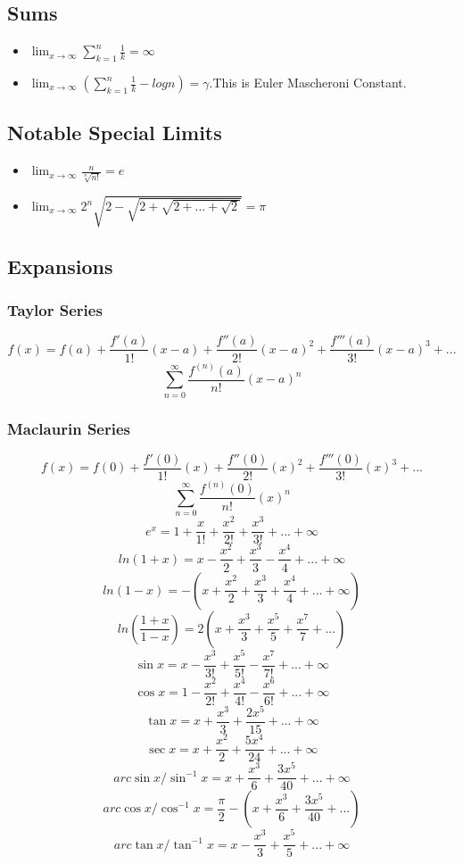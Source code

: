 \documentclass[12pt]{article}
\begin{document}
\subsection{Sums}
\begin{itemize}
\item $\lim_{x \to \infty} \sum_{k=1}^{n} \frac{1}{k}= 
\infty $
\item $\lim_{x \to \infty} (\sum_{k=1}^{n} \frac{1}{k}-logn)= 
\gamma $.This is Euler Mascheroni Constant.
\end{itemize}
\subsection{Notable Special Limits}
\begin{itemize}
\item $\lim_{x \to \infty} \frac{n}{\sqrt[n]{n!}}=e$
\item $\lim_{x \to \infty} 2^n \sqrt{2- \sqrt{2 + \sqrt{2 +...+ \sqrt{2}}}}= \pi $
\end{itemize}
\subsection{Expansions}
\subsubsection{Taylor Series}
$$f(x)=f(a)+\frac{f'(a)}{1!}(x-a)+\frac{f''(a)}{2!}(x-a)^2+\frac{f'''(a)}{3!}(x-a)^3+...$$
$$\sum_{n=0}^{\infty} \frac{f^{(n)}(a)}{n!}(x-a)^n$$
\subsubsection{Maclaurin Series}
$$f(x)=f(0)+\frac{f'(0)}{1!}(x)+\frac{f''(0)}{2!}(x)^2+\frac{f'''(0)}{3!}(x)^3+...$$
$$\sum_{n=0}^{\infty} \frac{f^{(n)}(0)}{n!}(x)^n$$
$$e^x = 1 + \frac{x}{1!}+ \frac{x^{2}}{2!}+ \frac{x^{3}}{3!}+...+ \infty$$
$$ln(1+x) = x - \frac{x^{2}}{2}+ \frac{x^{3}}{3}- \frac{x^{4}}{4}+...+ \infty$$
$$ln(1-x) = -(x + \frac{x^{2}}{2}+ \frac{x^{3}}{3}+ \frac{x^{4}}{4}+...+ \infty)$$
$$ln(\frac{1+x}{1-x}) = 2(x+ \frac{x^{3}}{3}+ \frac{x^{5}}{5}+ \frac{x^{7}}{7}+...)$$
$$\sin x = x - \frac{x^{3}}{3!}+ \frac{x^{5}}{5!}- \frac{x^{7}}{7!}+...+ \infty$$
$$\cos x = 1 - \frac{x^{2}}{2!}+ \frac{x^{4}}{4!}- \frac{x^{6}}{6!}+...+ \infty$$
$$\tan x = x + \frac{x^{3}}{3}+ \frac{2x^{5}}{15}+...+ \infty$$
$$\sec x = x + \frac{x^{2}}{2}+ \frac{5x^{4}}{24}+...+ \infty$$
$$arc \sin x/ \sin^{-1}x = x + \frac{x^{3}}{6}+ \frac{3x^{5}}{40}+...+ \infty$$
$$arc \cos x/ \cos^{-1}x = \frac{\pi}{2}- (x + \frac{x^{3}}{6}+ \frac{3x^{5}}{40}+...)$$
$$arc \tan x/\tan^{-1}x = x - \frac{x^{3}}{3}+ \frac{x^{5}}{5}+...+ \infty$$
\end{document}

